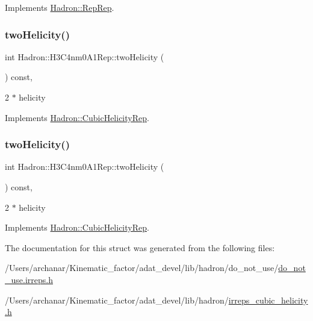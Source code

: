 Implements \mbox{\hyperlink{structHadron_1_1RepRep_ab3213025f6de249f7095892109575fde}{Hadron\+::\+Rep\+Rep}}.

\mbox{\label{structHadron_1_1H3C4nm0A1Rep_a98b5322646ba2129fe99f9b3c2a73b3f}} 
\subsubsection{\texorpdfstring{twoHelicity()}{twoHelicity()}\hspace{0.1cm}{\footnotesize\ttfamily [1/2]}}
{\footnotesize\ttfamily int Hadron\+::\+H3\+C4nm0\+A1\+Rep\+::two\+Helicity (\begin{DoxyParamCaption}{ }\end{DoxyParamCaption}) const\hspace{0.3cm}{\ttfamily [inline]}, {\ttfamily [virtual]}}

2 $\ast$ helicity 

Implements \mbox{\hyperlink{structHadron_1_1CubicHelicityRep_af507aa56fc2747eacc8cb6c96db31ecc}{Hadron\+::\+Cubic\+Helicity\+Rep}}.

\mbox{\label{structHadron_1_1H3C4nm0A1Rep_a98b5322646ba2129fe99f9b3c2a73b3f}} 
\subsubsection{\texorpdfstring{twoHelicity()}{twoHelicity()}\hspace{0.1cm}{\footnotesize\ttfamily [2/2]}}
{\footnotesize\ttfamily int Hadron\+::\+H3\+C4nm0\+A1\+Rep\+::two\+Helicity (\begin{DoxyParamCaption}{ }\end{DoxyParamCaption}) const\hspace{0.3cm}{\ttfamily [inline]}, {\ttfamily [virtual]}}

2 $\ast$ helicity 

Implements \mbox{\hyperlink{structHadron_1_1CubicHelicityRep_af507aa56fc2747eacc8cb6c96db31ecc}{Hadron\+::\+Cubic\+Helicity\+Rep}}.



The documentation for this struct was generated from the following files\+:\begin{DoxyCompactItemize}
\item 
/\+Users/archanar/\+Kinematic\+\_\+factor/adat\+\_\+devel/lib/hadron/do\+\_\+not\+\_\+use/\mbox{\hyperlink{do__not__use_8irreps_8h}{do\+\_\+not\+\_\+use.\+irreps.\+h}}\item 
/\+Users/archanar/\+Kinematic\+\_\+factor/adat\+\_\+devel/lib/hadron/\mbox{\hyperlink{lib_2hadron_2irreps__cubic__helicity_8h}{irreps\+\_\+cubic\+\_\+helicity.\+h}}\end{DoxyCompactItemize}
